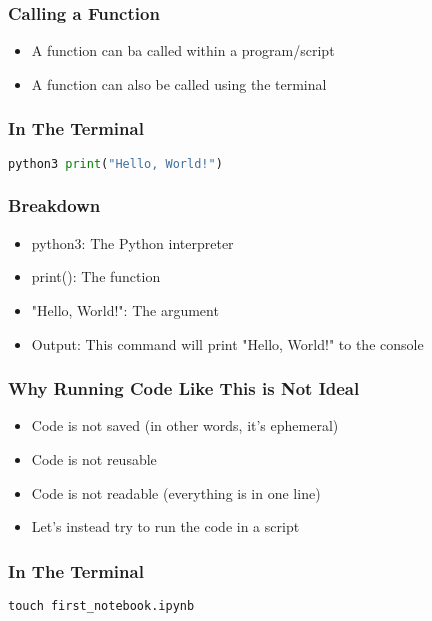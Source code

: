 \documentclass[serif, 9pt, aspectratio=32]{beamer}
\begin{document}
\begin{frame}
    \centering
    \frametitle{Calling a Function}
    \begin{itemize}
        \setlength{\itemsep}{3em}
        \item A function can ba called within a program/script
        \item A function can also be called using the terminal
    \end{itemize}
\end{frame}

\begin{frame}[fragile]
    \frametitle{In The Terminal}
    \begin{lstlisting}[language=Python]
        python3 print("Hello, World!")
    \end{lstlisting}
\end{frame}

\begin{frame}
    \centering
    \frametitle{Breakdown}
    \begin{itemize}
        \setlength{\itemsep}{3em}
        \item python3: The Python interpreter
        \item print(): The function
        \item "Hello, World!": The argument
        \item Output: This command will print "Hello, World!" to the console
    \end{itemize}
\end{frame}

\begin{frame}
    \centering
    \frametitle{Why Running Code Like This is Not Ideal}
    \begin{itemize}
        \setlength{\itemsep}{3em}
        \item Code is not saved (in other words, it's ephemeral)
        \item Code is not reusable
        \item Code is not readable (everything is in one line)
        \item Let's instead try to run the code in a script
    \end{itemize}
\end{frame}

\begin{frame}[fragile]
    \frametitle{In The Terminal}
    \begin{lstlisting}[language=Python]
        touch first_notebook.ipynb
    \end{lstlisting}
\end{frame}
\end{document}
